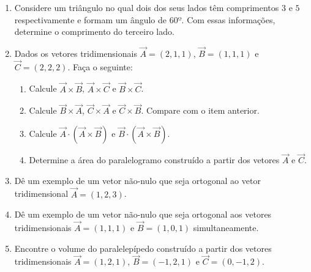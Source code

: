 \documentclass[a4paper]{article}
\begin{document}
\begin{enumerate}
\begin{enumerate}
\end{enumerate} 
\item Considere um triângulo no qual dois dos seus lados têm comprimentos $3$ e $5$ respectivamente e formam um ângulo de $60º$. Com essas informações, determine o comprimento do terceiro lado.
\item Dados os vetores tridimensionais $\vec A=(2,1,1)$, $\vec B=(1,1,1)$ e $\vec C=(2,2,2)$. Faça o seguinte:
\begin{enumerate}
	\item Calcule $\vec A\times \vec B$, $\vec A\times \vec C$ e $\vec B\times \vec C$.
	\item Calcule $\vec B\times \vec A$, $\vec C\times \vec A$ e $\vec C\times \vec B$. Compare com o item anterior.
	\item Calcule $\vec A\cdot (\vec A\times\vec B)$ e $\vec B\cdot(\vec A\times\vec B)$.
	\item Determine a área do paralelogramo construído a partir dos vetores $\vec A$ e $\vec C$.
\end{enumerate}
\item Dê um exemplo de um vetor não-nulo que seja ortogonal ao vetor tridimensional $\vec A=(1,2,3)$.
\item Dê um exemplo de um vetor não-nulo que seja ortogonal aos vetores tridimensionais $\vec A=(1,1,1)$ e $\vec B=(1,0,1)$ simultaneamente.
\item Encontre o volume do paralelepípedo construído a partir dos vetores tridimensionais $\vec A=(1,2,1)$, $\vec B=(-1,2,1)$ e $\vec C=(0,-1,2)$.
\end{enumerate}
\end{document}
